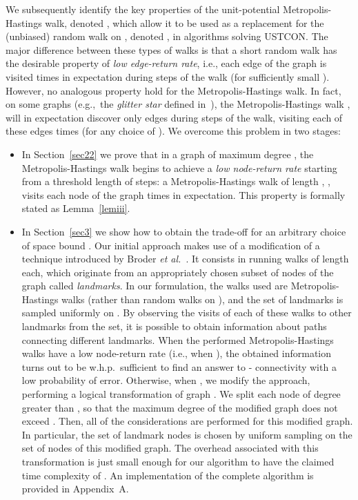 \documentclass[11pt,a4paper]{article}
\newcommand{\Broder}{Broder \etal}
\newcommand{\etal}{\textsl{et al.}\xspace}
\renewcommand{\*}{\hspace*{5mm}}
\begin{document}
We subsequently identify the key properties of the unit-potential Metropolis-Hastings walk, denoted , which allow it to be used as a replacement for the (unbiased) random walk on , denoted , in algorithms solving USTCON. The major difference between these types of walks is that a short random walk  has the desirable property of \emph{low edge-return rate}, i.e., each edge of the graph is visited  times in expectation during  steps of the walk (for sufficiently small ). However, no analogous property hold for the Metropolis-Hastings walk. In fact, on some graphs (e.g.,\ the \emph{glitter star} defined in~\cite{NOSY}), the Metropolis-Hastings walk , will in expectation discover only  edges during  steps of the walk, visiting each of these edges  times (for any choice of ). We overcome this problem in two stages:
\begin{itemize}

\item In Section~\ref{sec22} we prove that in a graph of maximum degree , the Metropolis-Hastings walk  begins to achieve a \emph{low node-return rate} starting from a threshold length of  steps: a Metropolis-Hastings walk of length , , visits each node of the graph  times in expectation. This property is formally stated as Lemma~\ref{lemiii}. 

\item In Section~\ref{sec3} we show how to obtain the trade-off   for an arbitrary choice of space bound . Our initial approach makes use of a modification of a technique introduced by \Broder~\cite{BKRU}. It consists in running  walks of length  each, which originate from an appropriately chosen subset of  nodes of the graph called \emph{landmarks}. In our formulation, the walks used are Metropolis-Hastings walks (rather than random walks on ), and the set of landmarks is sampled uniformly on . By observing the visits of each of these walks to other landmarks from the set, it is possible to obtain information about paths connecting different landmarks. When the performed Metropolis-Hastings walks have a low node-return rate (i.e., when ), the obtained information turns out to be w.h.p.\ sufficient to find an answer to - connectivity with a low probability of error. Otherwise, when , we modify the approach, performing a logical transformation of graph . We split each node of degree greater than , so that the maximum degree of the modified graph does not exceed . Then, all of the considerations are performed for this modified graph. In particular, the set of landmark nodes is chosen by uniform sampling on the set of nodes of this modified graph. The overhead associated with this transformation is just small enough for our algorithm to have the claimed time complexity of . An implementation of the complete algorithm is provided in Appendix~A.
\end{itemize}
\end{document}
